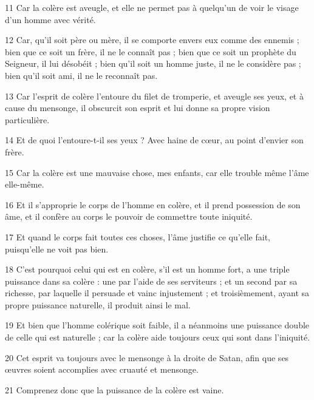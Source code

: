 \par 11 Car la colère est aveugle, et elle ne permet pas à quelqu'un de voir le visage d'un homme avec vérité.

\par 12 Car, qu'il soit père ou mère, il se comporte envers eux comme des ennemis ; bien que ce soit un frère, il ne le connaît pas ; bien que ce soit un prophète du Seigneur, il lui désobéit ; bien qu'il soit un homme juste, il ne le considère pas ; bien qu'il soit ami, il ne le reconnaît pas.

\par 13 Car l'esprit de colère l'entoure du filet de tromperie, et aveugle ses yeux, et à cause du mensonge, il obscurcit son esprit et lui donne sa propre vision particulière.

\par 14 Et de quoi l'entoure-t-il ses yeux ? Avec haine de cœur, au point d'envier son frère.

\par 15 Car la colère est une mauvaise chose, mes enfants, car elle trouble même l'âme elle-même.

\par 16 Et il s'approprie le corps de l'homme en colère, et il prend possession de son âme, et il confère au corps le pouvoir de commettre toute iniquité.

\par 17 Et quand le corps fait toutes ces choses, l'âme justifie ce qu'elle fait, puisqu'elle ne voit pas bien.

\par 18 C'est pourquoi celui qui est en colère, s'il est un homme fort, a une triple puissance dans sa colère : une par l'aide de ses serviteurs ; et un second par sa richesse, par laquelle il persuade et vainc injustement ; et troisièmement, ayant sa propre puissance naturelle, il produit ainsi le mal.

\par 19 Et bien que l'homme colérique soit faible, il a néanmoins une puissance double de celle qui est naturelle ; car la colère aide toujours ceux qui sont dans l'iniquité.

\par 20 Cet esprit va toujours avec le mensonge à la droite de Satan, afin que ses œuvres soient accomplies avec cruauté et mensonge.

\par 21 Comprenez donc que la puissance de la colère est vaine.

